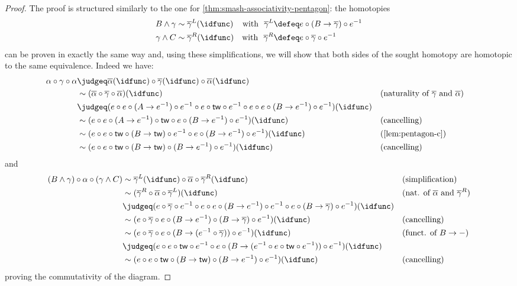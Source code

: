 \documentclass{article}
\newcommand{\smsh}{\wedge}
\renewcommand{\o}{\ensuremath{\circ}}
\newcommand{\sy}{^{-1}}
\newcommand{\alphabar}{\overline{\alpha}}
\newcommand{\gammabar}{\overline{\gamma}}
\newcommand{\twist}{\mathsf{tw}}
\begin{document}
\begin{proof}
	The proof is structured similarly to the one for \autoref{thm:smash-associativity-pentagon}: the homotopies
	\begin{align*}
	B \smsh \gamma &\sim \gammabar^L(\idfunc) &\text{with\ \ } \gammabar^L &\defeq e \o (B \to \gammabar) \o e\sy\\
	\gamma \smsh C &\sim \gammabar^R(\idfunc) &\text{with\ \ } \gammabar^R &\defeq e \o \gammabar \o e\sy
	\end{align*}		
	can be proven in exactly the same way and, using these simplifications, we will show that both sides of the sought homotopy are homotopic to the same equivalence. Indeed we have:
	\begin{align*}
		\alpha \o \gamma \o \alpha
		&\judgeq \alphabar(\idfunc) \o \gammabar(\idfunc) \o \alphabar(\idfunc)\\
		&\sim (\alphabar \o \gammabar \o \alphabar)(\idfunc) &&\text{(naturality of $\gammabar$ and $\alphabar$)}\\
		&\judgeq (e \o e \o (A \to e\sy) \o e\sy \o e \o \twist \o e\sy \o e \o e \o (B \to e\sy) \o e\sy)(\idfunc)\\
		&\sim (e \o e \o (A \to e\sy) \o \twist \o e \o (B \to e\sy) \o e\sy)(\idfunc) &&\text{(cancelling)}\\
		&\sim (e \o e \o \twist \o (B \to \twist) \o e\sy \o e \o (B \to e\sy) \o e\sy)(\idfunc) &&\text{(\autoref{lem:pentagon-c})}\\
		&\sim (e \o e \o \twist \o (B \to \twist) \o (B \to e\sy) \o e\sy)(\idfunc) &&\text{(cancelling)}
	\end{align*}
	and
	\begin{align*}
		(B \smsh \gamma) \o \alpha \o (\gamma \smsh C)
		&\sim \gammabar^L(\idfunc) \o \alphabar \o \gammabar^R(\idfunc) &&\text{(simplification)}\\
		&\sim (\gammabar^R \o \alphabar \o \gammabar^L)(\idfunc) &&\text{(nat. of $\alphabar$ and $\gammabar^R$)}\\
		&\judgeq (e \o \gammabar \o e\sy \o e \o e \o (B \to e\sy) \o e\sy \o e \o (B \to \gammabar) \o e\sy)(\idfunc)\\
		&\sim (e \o \gammabar \o e \o (B \to e\sy) \o (B \to \gammabar) \o e\sy)(\idfunc) &&\text{(cancelling)}\\
		&\sim (e \o \gammabar \o e \o (B \to (e\sy \o \gammabar)) \o e\sy)(\idfunc) &&\text{(funct. of $B \to -$)}\\
		&\judgeq (e \o e \o \twist \o e\sy \o e \o (B \to (e\sy \o e \o \twist \o e\sy)) \o e\sy)(\idfunc)\\
		&\sim (e \o e \o \twist \o (B \to \twist) \o (B \to e\sy) \o e\sy)(\idfunc) &&\text{(cancelling)}
	\end{align*}
	proving the commutativity of the diagram.
\end{proof}
\end{document}
